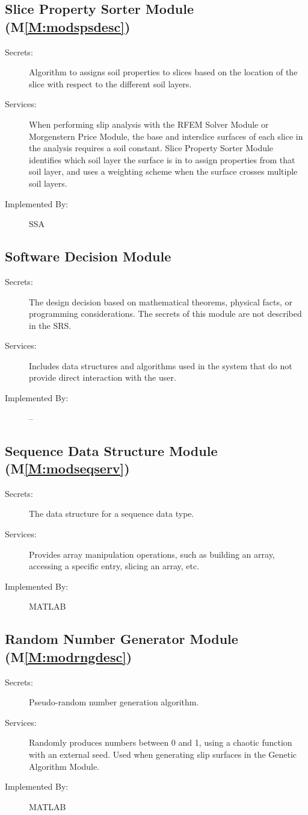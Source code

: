 \documentclass[12pt]{article}
\begin{document}
\subsection{Slice Property Sorter Module (M\ref{M:modspsdesc})}
\label{Sec:SlicPropSortModu()}
\begin{description}
\item[Secrets:]Algorithm to assigns soil properties to slices based on the location of the slice with respect to the different soil layers.
\item[Services:]When performing slip analysis with the RFEM Solver Module or Morgenstern Price Module, the base and interslice surfaces of each slice in the analysis requires a soil constant. Slice Property Sorter Module identifies which soil layer the surface is in to assign properties from that soil layer, and uses a weighting scheme when the surface crosses multiple soil layers.
\item[Implemented By:]SSA
\end{description}
\subsection{Software Decision Module}
\label{Sec:SoftDeciModu}
\begin{description}
\item[Secrets:]The design decision based on mathematical theorems, physical facts, or programming considerations. The secrets of this module are not described in the SRS.
\item[Services:]Includes data structures and algorithms used in the system that do not provide direct interaction with the user.
\item[Implemented By:]--
\end{description}
\subsection{Sequence Data Structure Module (M\ref{M:modseqserv})}
\label{Sec:SequDataStruModu()}
\begin{description}
\item[Secrets:]The data structure for a sequence data type.
\item[Services:]Provides array manipulation operations, such as building an array, accessing a specific entry, slicing an array, etc.
\item[Implemented By:]MATLAB
\end{description}
\subsection{Random Number Generator Module (M\ref{M:modrngdesc})}
\label{Sec:RandNumbGeneModu()}
\begin{description}
\item[Secrets:]Pseudo-random number generation algorithm.
\item[Services:]Randomly produces numbers between 0 and 1, using a chaotic function with an external seed. Used when generating slip surfaces in the Genetic Algorithm Module.
\item[Implemented By:]MATLAB
\end{description}
\end{document}
